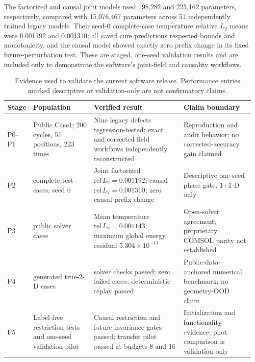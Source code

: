 \documentclass[preprint,12pt]{elsarticle}
\newcommand{\relLtwo}{\mathrm{rel}\,L_2}
\begin{document}
The factorized and causal joint models used 198,282 and 225,162 parameters,
respectively, compared with 15,076,467 parameters across 51 independently
trained legacy models. Their seed-0 complete-case temperature relative
\(L_2\) means were 0.001192 and 0.001310; all saved cure predictions respected
bounds and monotonicity, and the causal model showed exactly zero prefix
change in its fixed future-perturbation test. These are staged, one-seed
validation results and are included only to demonstrate the software's
joint-field and causality workflows.

\begin{table}[!ht]
\centering
\small
\caption{Evidence used to validate the current software release. Performance
entries marked descriptive or validation-only are not confirmatory claims.}
\label{tab:validation}
\begin{tabularx}{\textwidth}{>{\raggedright\arraybackslash}p{}
                              >{\raggedright\arraybackslash}p{}
                              >{\raggedright\arraybackslash}p{}
                              X}
\toprule
Stage & Population & Verified result & Claim boundary \\
\midrule
P0--P1 & Public Case1; 200 cycles, 51 positions, 223 times & Nine legacy defects regression-tested; exact and corrected field workflows independently reconstructed & Reproduction and audit behavior; no corrected-accuracy gain claimed \\
P2 & 125 complete test cases; seed 0 & Joint factorized \(\relLtwo=0.001192\); causal \(\relLtwo=0.001310\); zero causal prefix change & Descriptive one-seed phase gate; 1+1-D only \\
P3 & 200 public solver cases & Mean temperature \(\relLtwo=0.001143\); maximum global energy residual \(5.304\times10^{-13}\) & Open-solver agreement; proprietary COMSOL parity not established \\
P4 & 512 generated true-2-D cases & 27 solver checks passed; zero failed cases; deterministic replay passed & Public-data-anchored numerical benchmark; no geometry-OOD claim \\
P5 & Label-free restriction tests and one-seed validation pilot & Causal restriction and future-invariance gates passed; transfer pilot passed at budgets 8 and 16 & Initialization and functionality evidence; pilot comparison is validation-only \\
\bottomrule
\end{tabularx}
\end{table}
\end{document}
